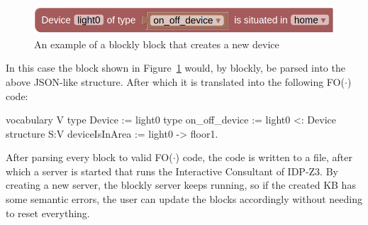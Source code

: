 \documentclass[11pt,a4paper]{report}
\newcommand{\fodot}{FO($\cdot$)\xspace}
\begin{document}
\begin{figure}
    \centering
    \includegraphics[width=0.8\linewidth]{images/blockly_new_device.png}
    \caption{An example of a blockly block that creates a new device}
    \label{fig:blockly_new_device}
\end{figure}

In this case the block shown in Figure~\ref{fig:blockly_new_device} would, by blockly, be parsed into the above JSON-like structure. After which it is translated into the following \fodot code:

\begin{idplisting}
vocabulary V {
    type Device := {light0}
    type on_off_device := {light0} <: Device
}
structure S:V {
    deviceIsInArea := {light0 -> floor1}.
}
\end{idplisting}

After parsing every block to valid \fodot code, the code is written to a file, after which a server is started that runs the Interactive Consultant of IDP-Z3. By creating a new server, the blockly server keeps running, so if the created KB has some semantic errors, the user can update the blocks accordingly without needing to reset everything.
\printbibliography
\end{document}
